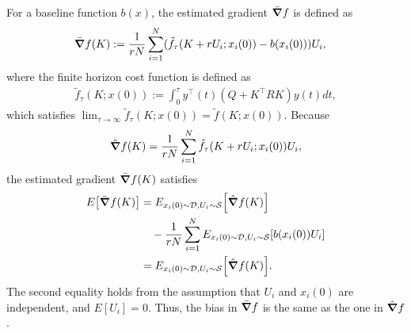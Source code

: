 For a baseline function $b(x)$, the estimated gradient $\bar \grad f$ is defined as
\begin{align}
    \bar \grad f(K)  &:= \frac{1}{rN}\sum_{i=1}^N (\tilde f_\tau(K+rU_i;x_i(0))-b(x_i(0)))U_i,\label{eq:grad-baseline-b}
\end{align}
where the finite horizon cost function is defined as
\begin{align}
    \tilde f_\tau(K;x(0)) := \int_0^\tau y^\top(t) ( Q + K^\top RK)y(t)dt\label{eq:ftau},
\end{align}
which satisfies $\lim_{\tau \to \infty} \tilde f_\tau(K;x(0)) = \tilde f(K;x(0))$.
Because 
\begin{align}
    \hat \grad f(K) = \frac{1}{rN}\sum_{i=1}^N \tilde f_{\tau}(K+r U_i;x_i(0))U_i,
\end{align}
the estimated gradient $\bar \grad f(K)$ satisfies
\begin{align}
  E\qty[\bar \grad f(K)] & = E_{x_i(0)\sim \mathcal{D}, U_i \sim \mathcal{S}}\qty[\hat \grad f(K)] \\
  & \quad - \frac{1}{rN}\sum_{i=1}^N E_{x_i(0)\sim \mathcal{D}, U_i \sim \mathcal{S}}\qty[b(x_i(0))U_i] \\
                         & = E_{x_i(0)\sim \mathcal{D}, U_i\sim \mathcal{S}}\qty[\hat \grad f(K)].
\end{align}
The second equality holds from the assumption that $U_i$ and $x_i(0)$ are independent, and
$E[U_i] = 0$.
Thus, the bias in $\bar \grad f$ is the same as the one in $\hat \grad f$.

